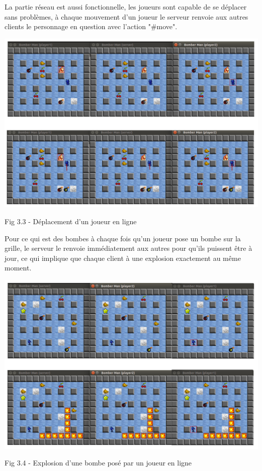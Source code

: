 \documentclass[12pt]{article}
\begin{document}
        La partie réseau est aussi fonctionnelle, les joueurs sont capable de se déplacer sans problèmes, à chaque mouvement d'un joueur le serveur renvoie aux autres clients le personnage en question avec l'action "#move".

        \includegraphics[scale=0.3]{deplacement.png}
        \begin{center}
            \caption{Fig 3.3 - Déplacement d'un joueur en ligne}
        \end{center}

        Pour ce qui est des bombes à chaque fois qu'un joueur pose un bombe sur la grille, le serveur le renvoie immédiatement aux autres pour qu'ils puissent être à jour, ce qui implique que chaque client à une explosion exactement au même moment.

        \includegraphics[scale=0.3]{explosion.png}
        \begin{center}
            \caption{Fig 3.4 - Explosion d'une bombe posé par un joueur en ligne}
        \end{center}
\end{document}
